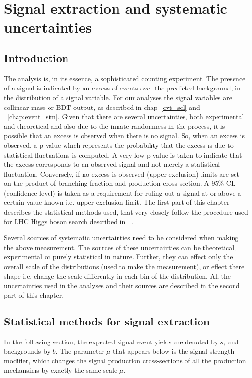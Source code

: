 
%
%

\chapter{Signal extraction and systematic uncertainties}
\label{sig_ext}
\section{Introduction}
The analysis is, in its essence, a sophisticated counting experiment. The presence of a signal is indicated by an excess of events over the predicted background, in the distribution of a signal variable. For our analyses the signal variables are collinear mass or BDT output, as described in chap~\ref{evt_sel} and ~\ref{chap:event_sim}. Given that there are several uncertainties, both experimental and theoretical and also due to the innate randomness in the process, it is possible that an excess is observed when there is no signal. So, when an excess is observed, a p-value which represents the probability that the excess is due to statistical fluctuations is computed. A very low p-value is taken to indicate that the excess corresponds to an observed signal and not merely a statistical fluctuation. Conversely, if no excess is observed (upper exclusion) limits are set on the product of branching fraction and production cross-section. A 95\% CL (confidence level) is taken as a requirement for ruling out a signal at or above a certain value known i.e. upper exclusion limit. The first part of this chapter describes the statistical methods used, that very closely follow the procedure used for LHC Higgs boson search described in ~\cite{note2011}.

Several sources of systematic uncertainties need to be considered when making the above measurement. The sources of these uncertainties can be theoretical, experimental or purely statistical in nature. Further, they can effect only the overall scale of the distributions (used to make the measurement), or effect there shape i.e. change the scale differently in each bin of the distribution. All the uncertainties used in the analyses and their sources are described in the second part of this chapter.      



\section{Statistical methods for signal extraction}
In the following section, the expected signal event yields are denoted by $s$, and backgrounds by $b$. The parameter $\mu$ that appears below is the signal strength modifier, which changes the signal production cross-sections of all the production mechansims by exactly the same scale $\mu$.
\label{stat_meth}
